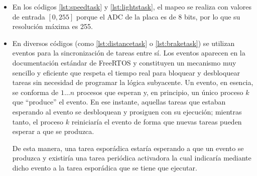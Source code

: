\begin{itemize}
  \item En los códigos \ref{lst:speedtask} y \ref{lst:lightstask}, el mapeo se realiza con valores
        de entrada $\left[0, 255\right]$ porque el ADC de la placa
        es de 8 bits, por lo que su resolución máxima es 255.
  \item En diversos códigos (como \ref{lst:distancetask} o \ref{lst:braketask}) se
        utilizan eventos para la sincronización de tareas entre sí. Los eventos
        aparecen en la documentación estándar de FreeRTOS y constituyen un mecanismo
        muy sencillo y eficiente que respeta el tiempo real para bloquear y desbloquear
        tareas sin necesidad de programar la lógica subyacente. Un evento, en esencia,
        se conforma de $1 \dots n$ procesos que esperan y, en principio, un único proceso
        $k$ que ``produce'' el evento. En ese instante, aquellas tareas que estaban
        esperando al evento se desbloquean y prosiguen con su ejecución; mientras tanto,
        el proceso $k$ reiniciaría el evento de forma que nuevas tareas pueden esperar
        a que se produzca.

        De esta manera, una tarea esporádica estaría esperando a que un evento se
        produzca y existiría una tarea periódica activadora la cual indicaría
        mediante dicho evento a la tarea esporádica que se tiene que ejecutar.
\end{itemize}
